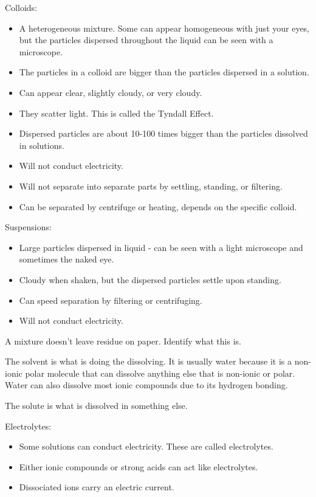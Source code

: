 \documentclass[../hchem.tex]{subfiles}
\begin{document}
Colloids:
\begin{itemize}
    \item A heterogeneous mixture. Some can appear homogeneous with just your eyes, but the particles dispersed throughout the liquid can be seen with a microscope.
    \item The particles in a colloid are bigger than the particles dispersed in a solution.
    \item Can appear clear, slightly cloudy, or very cloudy.
    \item They scatter light. This is called the Tyndall Effect.
    \item Dispersed particles are about 10-100 times bigger than the particles dissolved in solutions.
    \item Will not conduct electricity.
    \item Will not separate into separate parts by settling, standing, or filtering.
    \item Can be separated by centrifuge or heating, depends on the specific colloid.
\end{itemize}

Suspensions:
\begin{itemize}
    \item Large particles dispersed in liquid - can be seen with a light microscope and sometimes the naked eye.
    \item Cloudy when shaken, but the dispersed particles settle upon standing.
    \item Can speed separation by filtering or centrifuging.
    \item Will not conduct electricity.
\end{itemize}

\ex A mixture doesn't leave residue on paper. Identify what this is.

The solvent is what is doing the dissolving. It is usually water because it is a non-ionic polar molecule that can dissolve anything else that is non-ionic or polar. Water can also dissolve most ionic compounds due to its hydrogen bonding.

The solute is what is dissolved in something else.

Electrolytes:
\begin{itemize}
    \item Some solutions can conduct electricity. These are called electrolytes.
    \item Either ionic compounds or strong acids can act like electrolytes.
    \item Dissociated ions carry an electric current.
\end{itemize}
\end{document}
